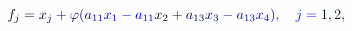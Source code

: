 \documentclass[12pt]{article}
\begin{document}
\makeatletter
\renewcommand*{\@textcolor}[3]{%
  \protect\leavevmode
  \begingroup
    \color#1{#2}#3%
  \endgroup
}
\makeatother
\begin{displaymath}
\mathcolor[RGB]{0,0,15}{f} _ { \mathcolor[RGB]{0,0,30}{j} } \mathcolor[RGB]{0,0,45}{=} \mathcolor[RGB]{0,0,60}{x} _ { \mathcolor[RGB]{0,0,75}{j} } \mathcolor[RGB]{0,0,90}{+} \mathcolor[RGB]{0,0,105}{\varphi} \mathcolor[RGB]{0,0,120}{(} \mathcolor[RGB]{0,0,135}{a} _ { \mathcolor[RGB]{0,0,150}{1} \mathcolor[RGB]{0,0,165}{1} } \mathcolor[RGB]{0,0,180}{x} _ { \mathcolor[RGB]{0,0,195}{1} } \mathcolor[RGB]{0,0,210}{-} \mathcolor[RGB]{0,0,225}{a} _ { \mathcolor[RGB]{0,0,240}{1} \mathcolor[RGB]{0,0,255}{1} } \mathcolor[RGB]{0,15,0}{x} _ { \mathcolor[RGB]{0,15,15}{2} } \mathcolor[RGB]{0,15,30}{+} \mathcolor[RGB]{0,15,45}{a} _ { \mathcolor[RGB]{0,15,60}{1} \mathcolor[RGB]{0,15,75}{3} } \mathcolor[RGB]{0,15,90}{x} _ { \mathcolor[RGB]{0,15,105}{3} } \mathcolor[RGB]{0,15,120}{-} \mathcolor[RGB]{0,15,135}{a} _ { \mathcolor[RGB]{0,15,150}{1} \mathcolor[RGB]{0,15,165}{3} } \mathcolor[RGB]{0,15,180}{x} _ { \mathcolor[RGB]{0,15,195}{4} } \mathcolor[RGB]{0,15,210}{)} \mathcolor[RGB]{0,15,225}{,} \quad \mathcolor[RGB]{0,15,240}{j} \mathcolor[RGB]{0,15,255}{=} \mathcolor[RGB]{0,30,0}{1} \mathcolor[RGB]{0,30,15}{,} \mathcolor[RGB]{0,30,30}{2} \mathcolor[RGB]{0,30,45}{,} \,
\end{displaymath}
\end{document}
